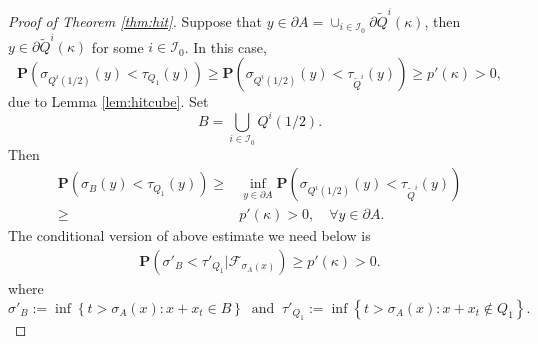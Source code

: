 \documentclass[twoside, 12pt]{book}
\numberwithin{equation}{chapter}
\def\cF{{\mathcal F}}
\def\cI{{\mathcal I}}
\def\bP{{\mathbf P}}
\def\l{\left}
\def\r{\right}
\def\geq{\geqslant}
\def\p{\partial}
\begin{document}
\begin{proof}[Proof of Theorem \ref{thm:hit}]
		Suppose that $y\in \p A=\cup_{i\in \cI_0} \p \widetilde{Q}^i(\kappa)$, then $y\in \p \widetilde{Q}^i(\kappa)$ for some $i\in \cI_0$. In this case, 
		\begin{equation*}
			\bP\l( \sigma_{Q^i(1/2)}(y)< \tau_{Q_1}(y) \r)\geq \bP\l( \sigma_{Q^i(1/2)}(y)< \tau_{\widetilde{Q}^i}(y) \r)\geq p'(\kappa)>0, 
		\end{equation*}
		due to Lemma \ref{lem:hitcube}. Set 
        \[
            B= \bigcup_{i\in \cI_0} Q^i(1/2). 
        \]
        Then 
        \begin{equation*}
          \begin{aligned}
              \bP \l( \sigma_{B}(y)<\tau_{Q_1}(y)\r)\geq& \inf_{y\in \p A} \bP\l( \sigma_{Q^i(1/2)}(y)< \tau_{\widetilde{Q}^i}(y) \r) \\
              \geq& p'(\kappa)>0, \quad \forall y\in \p A. 
          \end{aligned}
        \end{equation*}
        The conditional version of above estimate we need below is 
         \begin{equation}\label{eq:hit2}
          \begin{aligned}
              \bP \l( \sigma'_{B}<\tau'_{Q_1}\big| \cF_{\sigma_A(x)}\r)\geq p'(\kappa)>0. 
          \end{aligned}
        \end{equation}
        where 
        \[
        \sigma'_B:=\inf\l\{t>\sigma_A(x): x+x_t\in B \r\} ~\mbox{ and }~ \tau'_{Q_1}:=\inf\l\{t>\sigma_A(x): x+x_t\notin Q_1\r\}. 
        \]
		

\end{proof}
\end{document}
